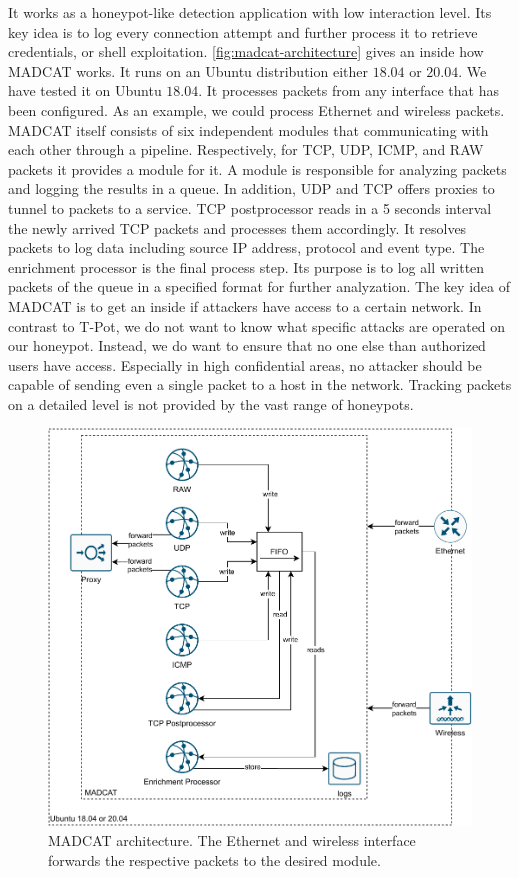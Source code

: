 It works as a honeypot-like detection application with low interaction level. 
Its key idea is to log every connection attempt and further process it to retrieve credentials, or shell exploitation.
\autoref{fig:madcat-architecture} gives an inside how MADCAT works.
It runs on an Ubuntu distribution either $18.04$ or $20.04$.
We have tested it on Ubuntu $18.04$.
It processes packets from any interface that has been configured.
As an example, we could process Ethernet and wireless packets.
MADCAT itself consists of six independent modules that communicating with each other through a pipeline.
Respectively, for TCP, UDP, ICMP, and RAW packets it provides a module for it.
A module is responsible for analyzing packets and logging the results in a queue.
In addition, UDP and TCP offers proxies to tunnel to packets to a service.
TCP postprocessor reads in a 5 seconds interval the newly arrived TCP packets and processes them accordingly.
It resolves packets to log data including source IP address, protocol and event type.
The enrichment processor is the final process step.
Its purpose is to log all written packets of the queue in a specified format for further analyzation.
The key idea of MADCAT is to get an inside if attackers have access to a certain network.
In contrast to T-Pot, we do not want to know what specific attacks are operated on our honeypot.
Instead, we do want to ensure that no one else than authorized users have access.
Especially in high confidential areas, no attacker should be capable of sending even a single packet to a host in the network.
Tracking packets on a detailed level is not provided by the vast range of honeypots.

\begin{figure}[ht]
    \centering
    \includegraphics[width=\textwidth]{figures/heicat-architecture.pdf}
    \caption[MADCAT architecture]{MADCAT architecture. The Ethernet and wireless interface forwards the respective packets to the desired module.}
    \label{fig:madcat-architecture}
\end{figure}

